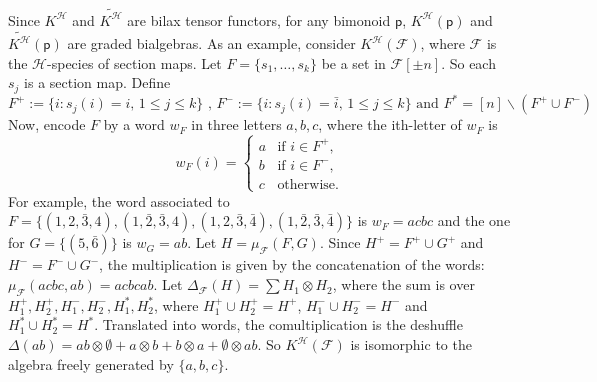 \documentclass[11pt,reqno]{amsart}
\numberwithin{equation}{section}
\def\SpB{{\mathbf{Sp}^{\H}}}
\def\H{{\mathcal{H}}}
\def\p{{\textsf{p}}}
\def\q{{\textsf{q}}}
\def\F{\mathcal{F}}
\def\KB{K^{\H}}
\def\KBt{\widetilde{K^{\H}}}
\def\n{\bar{n},n}
\def\can{\mathrm{can}}
\def\st{\mathrm{st}}
\def\can{\mathrm{can}}
\begin{document}
Since $\KB$ and $\KBt$ are bilax tensor functors, for any bimonoid $\p$, $\KB(\p)$ and $\KBt(\p)$ are graded bialgebras. As an example, consider $\KB(\F)$, where $\F$ is the $\H$-species of section maps. Let $F=\{s_1,\dots,s_k\}$ be a set in $\F[\pm n]$. So each $s_j$ is a section map. Define 
$$F^+:=\{i: s_j(i)=i,\, 1\leq j\leq k\} \text{ , } F^-:= \{i: s_j(i)=\bar{i},\, 1\leq j\leq k\} \text{ and } F^{\ast}=[n]\backslash(F^+\cup F^-)$$
Now, encode $F$ by a word $w_F$ in three letters $a,b,c$, where the ith-letter of $w_F$ is
\begin{equation*}
w_F(i)= \begin{cases}  a & \text{if $i\in F^+$,}\\ b & \text{if $i\in F^-$,}\\ c & \text{otherwise.} \end{cases}
\end{equation*}
For example, the word associated to $F=\{(1,2,\bar{3},4),(1,\bar{2},\bar{3},4),(1,2,\bar{3},\bar{4}),(1,\bar{2},\bar{3},\bar{4})\}$ is $w_F=acbc$ and the one for $G=\{(5,\bar{6})\}$ is $w_G=ab$. Let $H=\mu_{\F}(F,G)$. Since $H^+=F^+\cup G^+$ and $H^-=F^-\cup G^-$, the multiplication is given by the concatenation of the words: $\mu_{\F}(acbc,ab)=acbcab$. Let $\Delta_{\F}(H)=\sum H_1 \otimes H_2$, where the sum is over $H_1^+,H_2^+,H_1^-,H_2^-,H_1^{\ast},H_2^{\ast}$, where $H_1^+\cup H_2^+ = H^+$, $H_1^-\cup H_2^-=H^-$ and $H_1^{\ast}\cup H_2^{\ast}=H^{\ast}$. Translated into words, the comultiplication is the deshuffle $\Delta(ab)=ab\otimes \emptyset + a\otimes b + b\otimes a + \emptyset\otimes ab$. So $\KB(\F)$ is isomorphic to the algebra freely generated by $\{a,b,c\}$.




\end{document}
